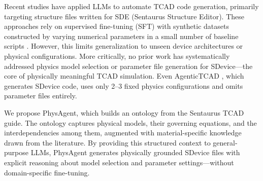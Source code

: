 Recent studies have applied LLMs to automate TCAD code generation, primarily targeting structure files written for SDE (Sentaurus Structure Editor). These approaches rely on supervised fine-tuning (SFT) with synthetic datasets constructed by varying numerical parameters in a small number of baseline scripts \cite{nguyen, chattcad, malts, agentictcad}. However, this limits generalization to unseen device architectures or physical configurations. More critically, {\color{red}no prior work has systematically addressed} physics model selection or parameter file generation for SDevice---the core of physically meaningful TCAD simulation. Even AgenticTCAD \cite{agentictcad}, which generates SDevice code, uses only 2--3 fixed physics configurations and omits parameter files entirely.

We propose PhysAgent, which {\color{red}builds an ontology from the Sentaurus TCAD guide. The ontology captures physical models, their governing equations, and the interdependencies among them, augmented with material-specific knowledge drawn from the literature}. By providing this structured context to general-purpose LLMs, PhysAgent generates physically grounded SDevice files with explicit reasoning about model selection and parameter settings---without domain-specific fine-tuning.
